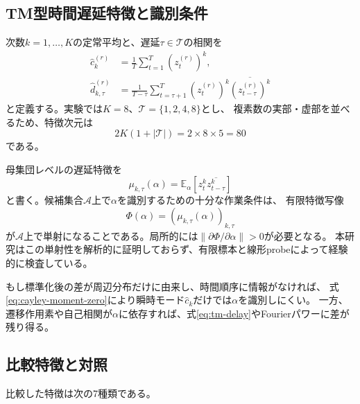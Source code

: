 \documentclass[a4paper,11pt]{jlreq}
\newcommand{\E}{\mathbb{E}}
\begin{document}
\subsection{TM型時間遅延特徴と識別条件}

次数$k=1,\ldots,K$の定常平均と、遅延$\tau\in\mathcal T$の相関を
\begin{align}
    \widehat c_k^{(r)}
    &=\frac{1}{T}\sum_{t=1}^{T}\left(z_t^{(r)}\right)^k, \\
    \widehat d_{k,\tau}^{(r)}
    &=\frac{1}{T-\tau}
      \sum_{t=\tau+1}^{T}
      \left(z_t^{(r)}\right)^k
      \overline{\left(z_{t-\tau}^{(r)}\right)^k}
    \label{eq:tm-delay}
\end{align}
と定義する。実験では$K=8$、$\mathcal T=\{1,2,4,8\}$とし、
複素数の実部・虚部を並べるため、特徴次元は
\begin{equation}
    2K\left(1+|\mathcal T|\right)=2\times8\times5=80
\end{equation}
である。

母集団レベルの遅延特徴を
\begin{equation}
    \mu_{k,\tau}(\alpha)
    =\E_{\alpha}\!\left[
      z_t^k\overline{z_{t-\tau}^k}
    \right]
    \label{eq:population-delay}
\end{equation}
と書く。候補集合$\mathcal A$上で$\alpha$を識別するための十分な作業条件は、
有限特徴写像
\begin{equation}
    \Phi(\alpha)
    =\left(\mu_{k,\tau}(\alpha)\right)_{k,\tau}
\end{equation}
が$\mathcal A$上で単射になることである。局所的には$\|\partial\Phi/\partial\alpha\|>0$が必要となる。
本研究はこの単射性を解析的に証明しておらず、有限標本と線形probeによって経験的に検査している。

もし標準化後の差が周辺分布だけに由来し、時間順序に情報がなければ、
式\eqref{eq:cayley-moment-zero}により瞬時モード$\widehat c_k$だけでは$\alpha$を識別しにくい。
一方、遷移作用素や自己相関が$\alpha$に依存すれば、式\eqref{eq:tm-delay}やFourierパワーに差が残り得る。

\subsection{比較特徴と対照}

比較した特徴は次の7種類である。
\end{document}
